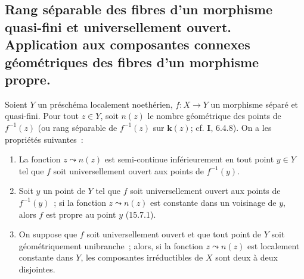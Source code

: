 
\subsection{Rang séparable des fibres d'un morphisme quasi-fini et universellement ouvert. Application aux composantes connexes géométriques des fibres d'un morphisme propre.}
\label{subsection:IV.15.5-fr}

\begin{proposition}[15.5.1]
\label{IV.15.5.1-fr}
Soient $Y$ un préschéma localement noethérien, $f:X\to Y$ un morphisme séparé et quasi-fini. Pour tout $z\in Y$, soit $n(z)$ le nombre géométrique des points de $f^{-1}(z)$ \textup{(ou} rang séparable \textup{de} $f^{-1}(z)$ \textup{sur} $\boldsymbol{k}(z)$\textup{; cf. \textbf{I}, 6.4.8)}. On a les propriétés suivantes~:
\begin{enumerate}[label=\emph{(\roman*)}]
  \item La fonction $z\leadsto n(z)$ est semi-continue inférieurement en tout point $y\in Y$ tel que $f$ soit universellement ouvert aux points de $f^{-1}(y)$.
  \item Soit $y$ un point de $Y$ tel que $f$ soit universellement ouvert aux points de $f^{-1}(y)$~; si la fonction $z\leadsto n(z)$ est constante dans un voisinage de $y$, alors $f$ est propre au point $y$ \textup{(15.7.1)}.
  \item On suppose que $f$ soit universellement ouvert et que tout point de $Y$ soit géométriquement unibranche~; alors, si la fonction $z\leadsto n(z)$ est localement constante dans $Y$, les composantes irréductibles de $X$ sont deux à deux disjointes.
\end{enumerate}
\end{proposition}

